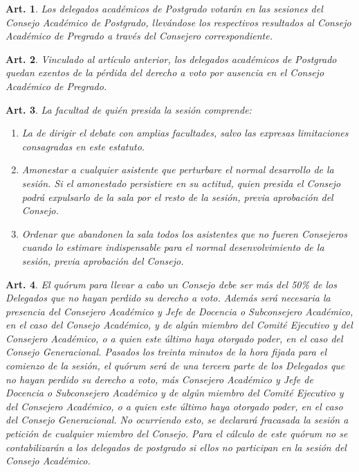 \documentclass[letterpaper,11pt]{article}
\theoremstyle{plain}
\newtheorem{art}{Art.} %
\begin{document}
			\begin{art}\label{sesionesPostgrado}
				Los delegados académicos de Postgrado votarán en las sesiones del Consejo Académico de Postgrado, llevándose los respectivos resultados al Consejo Académico de Pregrado a través del Consejero correspondiente.
			\end{art}

			\begin{art}\label{votosPostgrado}
				Vinculado al artículo anterior, los delegados académicos de Postgrado quedan exentos de la pérdida del derecho a voto por ausencia en el Consejo Académico de Pregrado.
			\end{art}

			\begin{art}\label{facultadesPrecide}
				La facultad de quién presida la sesión comprende:
				\begin{enumerate}
					\item La de dirigir el debate con amplias facultades, salvo las expresas limitaciones consagradas en este estatuto.
					\item Amonestar a cualquier asistente que perturbare el normal desarrollo de la sesión. Si el amonestado persistiere en su actitud,  quien presida el Consejo podrá expulsarlo de la sala por el resto de la sesión, previa aprobación del Consejo.
					\item Ordenar que abandonen la sala todos los asistentes que no fueren Consejeros cuando lo estimare indispensable para el normal desenvolvimiento de la sesión, previa aprobación del Consejo.
				\end{enumerate}
			\end{art}

			\begin{art}\label{quorumConsejo}
				El quórum para llevar a cabo un Consejo debe ser más del 50\% de los Delegados que no hayan perdido su derecho a voto. Además será necesaria la presencia del Consejero Académico y Jefe de Docencia o Subconsejero Académico, en el caso del Consejo Académico, y de algún miembro del Comité Ejecutivo y del Consejero Académico, o a quien este último haya otorgado poder, en el caso del Consejo Generacional. Pasados los treinta minutos de la hora fijada para el comienzo de la sesión, el quórum será de una tercera parte de los Delegados que no hayan perdido su derecho a voto, más Consejero Académico y Jefe de Docencia o Subconsejero Académico y de algún miembro del Comité Ejecutivo y del Consejero Académico, o a quien este último haya otorgado poder, en el caso del Consejo Generacional. No ocurriendo esto, se declarará fracasada la sesión a petición de cualquier miembro del Consejo. Para el cálculo de este quórum no se contabilizarán a los delegados de postgrado si ellos no participan en la sesión del Consejo Académico.
			\end{art}
\end{document}
